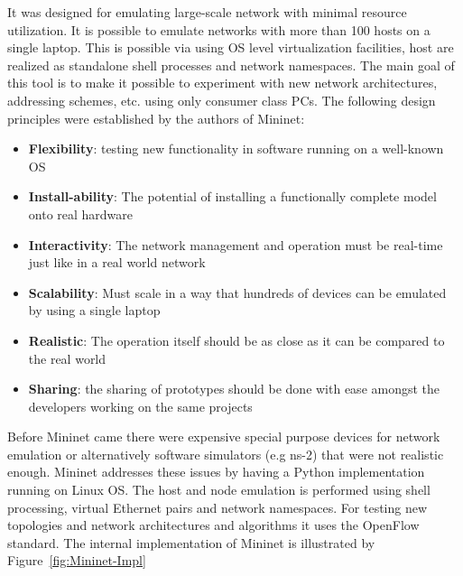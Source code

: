 \documentclass[a4paper]{article}
\begin{document}
It was designed for emulating large-scale network with minimal resource utilization. It is possible to emulate networks
with more than 100 hosts on a single laptop. This is possible via using OS level virtualization facilities, host are
realized as standalone shell processes and network namespaces. The main goal of this tool is to make it possible to
experiment with new network architectures, addressing schemes, etc. using only consumer class PCs. The following design
principles were established by the authors of Mininet:
\begin{itemize}
    \item \textbf{Flexibility}: testing new functionality in software running on a well-known OS
    \item \textbf{Install-ability}: The potential of installing a functionally complete model onto real hardware
    \item \textbf{Interactivity}: The network management and operation must be real-time just like in a real world
          network
    \item \textbf{Scalability}: Must scale in a way that hundreds of devices can be emulated by using a single laptop
    \item \textbf{Realistic}: The operation itself should be as close as it can be compared to the real world
    \item \textbf{Sharing}: the sharing of prototypes should be done with ease amongst the developers working on the
          same
          projects
\end{itemize}

Before Mininet came there were expensive special purpose devices for network emulation or alternatively software
simulators (e.g ns-2) that were not realistic enough. Mininet addresses these issues by having a Python implementation
running on Linux OS. The host and node emulation is performed using shell processing, virtual Ethernet pairs and
network namespaces. For testing new topologies and network architectures and algorithms it uses the OpenFlow standard.
The internal implementation of Mininet is illustrated by Figure~\ref{fig:Mininet-Impl}
\end{document}
